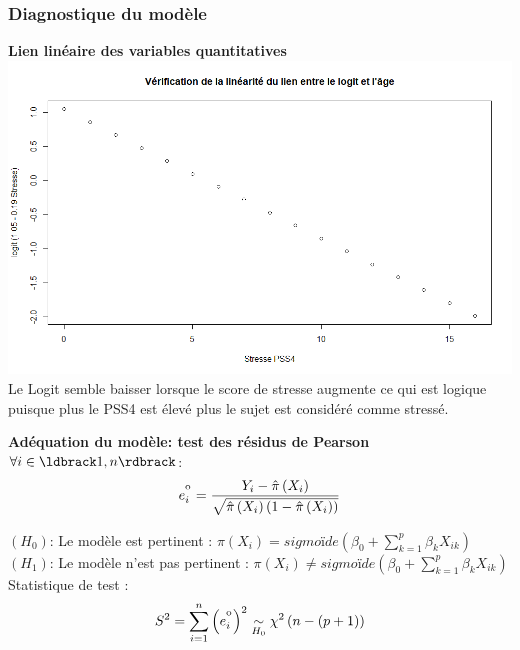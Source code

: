 \documentclass{book}
\begin{document}
\subsubsection{Diagnostique du modèle}

\noindent
\textbf{Lien linéaire des variables quantitatives}\\
\includegraphics[scale=.5]{linearite_stresse.png}\\
Le Logit semble baisser lorsque le score de stresse augmente ce qui est logique puisque plus le PSS4 est élevé plus le sujet est considéré comme stressé.\\
\bigskip

\noindent
\textbf{Adéquation du modèle: test des résidus de Pearson}\\

\bigskip
\noindent
$\forall i \in \ldbrack 1,n \rdbrack$:\\
\begin{align*}
e_i^{\textsuperscript{o}} = {
{Y_i - \hat{\pi}\left(X_i\right)} 
\over 
{\sqrt{\hat{\pi}\left(X_i\right)\left(1-\hat{\pi}\left(X_i\right)\right)}}
}
\end{align*}

\noindent
$\left( H_0 \right)$: Le modèle est pertinent : $\pi\left(X_i\right) = sigmoïde\left(\beta_0 + \sum_{k=1}^p {\beta_k X_{ik}}\right)$\\
$\left( H_1 \right)$: Le modèle n'est pas pertinent : $\pi\left(X_i\right) \neq sigmoïde\left(\beta_0 + \sum_{k=1}^p {\beta_k X_{ik}}\right)$\\
Statistique de test : \\
\begin{align*}
S^2 = \sum_{i = 1}^n {{\left(e_i^{\textsuperscript{o}}\right)}^2} 
\underset{\tiny{H_0}}{\sim}
\chi ^2 \left(n-\left( p+1 \right)\right)
\\
\end{align*}
\end{document}
